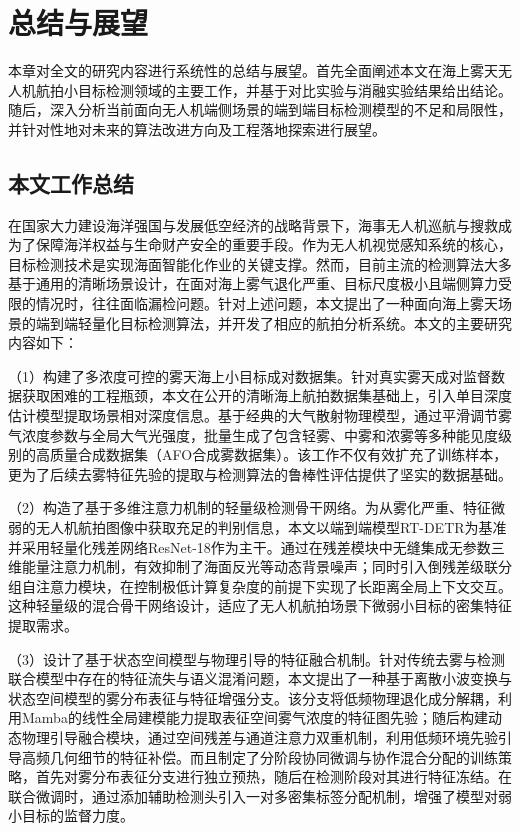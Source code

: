 
\chapter{总结与展望}
\label{chap:conclusion}

本章对全文的研究内容进行系统性的总结与展望。首先全面阐述本文在海上雾天无人机航拍小目标检测领域的主要工作，并基于对比实验与消融实验结果给出结论。随后，深入分析当前面向无人机端侧场景的端到端目标检测模型的不足和局限性，并针对性地对未来的算法改进方向及工程落地探索进行展望。

\section{本文工作总结}
\label{sec:summary}
在国家大力建设海洋强国与发展低空经济的战略背景下，海事无人机巡航与搜救成为了保障海洋权益与生命财产安全的重要手段。作为无人机视觉感知系统的核心，目标检测技术是实现海面智能化作业的关键支撑。然而，目前主流的检测算法大多基于通用的清晰场景设计，在面对海上雾气退化严重、目标尺度极小且端侧算力受限的情况时，往往面临漏检问题。针对上述问题，本文提出了一种面向海上雾天场景的端到端轻量化目标检测算法，并开发了相应的航拍分析系统。本文的主要研究内容如下：

（1）构建了多浓度可控的雾天海上小目标成对数据集。针对真实雾天成对监督数据获取困难的工程瓶颈，本文在公开的清晰海上航拍数据集基础上，引入单目深度估计模型提取场景相对深度信息。基于经典的大气散射物理模型，通过平滑调节雾气浓度参数与全局大气光强度，批量生成了包含轻雾、中雾和浓雾等多种能见度级别的高质量合成数据集（AFO合成雾数据集）。该工作不仅有效扩充了训练样本，更为了后续去雾特征先验的提取与检测算法的鲁棒性评估提供了坚实的数据基础。

（2）构造了基于多维注意力机制的轻量级检测骨干网络。为从雾化严重、特征微弱的无人机航拍图像中获取充足的判别信息，本文以端到端模型RT-DETR为基准并采用轻量化残差网络ResNet-18作为主干。通过在残差模块中无缝集成无参数三维能量注意力机制，有效抑制了海面反光等动态背景噪声；同时引入倒残差级联分组自注意力模块，在控制极低计算复杂度的前提下实现了长距离全局上下文交互。这种轻量级的混合骨干网络设计，适应了无人机航拍场景下微弱小目标的密集特征提取需求。

（3）设计了基于状态空间模型与物理引导的特征融合机制。针对传统去雾与检测联合模型中存在的特征流失与语义混淆问题，本文提出了一种基于离散小波变换与状态空间模型的雾分布表征与特征增强分支。该分支将低频物理退化成分解耦，利用Mamba的线性全局建模能力提取表征空间雾气浓度的特征图先验；随后构建动态物理引导融合模块，通过空间残差与通道注意力双重机制，利用低频环境先验引导高频几何细节的特征补偿。而且制定了分阶段协同微调与协作混合分配的训练策略，首先对雾分布表征分支进行独立预热，随后在检测阶段对其进行特征冻结。在联合微调时，通过添加辅助检测头引入一对多密集标签分配机制，增强了模型对弱小目标的监督力度。

